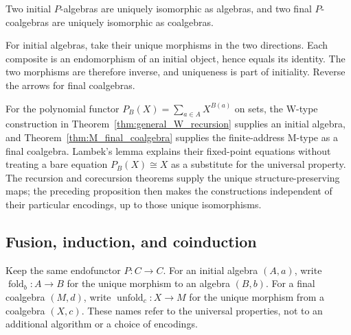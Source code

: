 \begin{proposition}
Two initial $P$-algebras are uniquely isomorphic as algebras, and two
final $P$-coalgebras are uniquely isomorphic as coalgebras.
\end{proposition}
\Proof
For initial algebras, take their unique morphisms in the two directions.
Each composite is an endomorphism of an initial object, hence equals
its identity. The two morphisms are therefore inverse, and uniqueness
is part of initiality. Reverse the arrows for final coalgebras.
\Done

For the polynomial functor
$P_B(X)=\sum_{a\in A}X^{B(a)}$ on sets, the W-type construction in
Theorem~\ref{thm:general_W_recursion} supplies an initial algebra, and
Theorem~\ref{thm:M_final_coalgebra} supplies the finite-address M-type
as a final coalgebra.
Lambek's lemma explains their fixed-point equations without treating a
bare equation $P_B(X)\cong X$ as a substitute for the universal property.
The recursion and corecursion theorems supply the unique structure-preserving
maps; the preceding proposition then makes the constructions independent
of their particular encodings, up to those unique isomorphisms.

\subsection{Fusion, induction, and coinduction}
Keep the same endofunctor $P:C\to C$. For an initial algebra $(A,a)$,
write $\operatorname{fold}_b:A\to B$ for the unique morphism to an
algebra $(B,b)$. For a final coalgebra $(M,d)$, write
$\operatorname{unfold}_c:X\to M$ for the unique morphism from a
coalgebra $(X,c)$. These names refer to the universal properties,
not to an additional algorithm or a choice of encodings.

